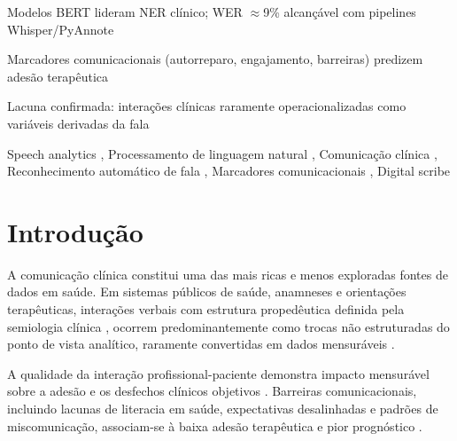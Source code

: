 \documentclass[a4paper,fleqn]{cas-sc}
\begin{document}
\begin{highlights}
\item Modelos BERT lideram NER clínico; WER $\approx$9\% alcançável com
      pipelines Whisper/PyAnnote
\item Marcadores comunicacionais (autorreparo, engajamento, barreiras)
      predizem adesão terapêutica
\item Lacuna confirmada: interações clínicas raramente operacionalizadas
      como variáveis derivadas da fala
\end{highlights}

\begin{keywords}
Speech analytics \sep
Processamento de linguagem natural \sep
Comunicação clínica \sep
Reconhecimento automático de fala \sep
Marcadores comunicacionais \sep
Digital scribe
\end{keywords}

\maketitle

\section{Introdução}
\label{sec:intro}

A comunicação clínica constitui uma das mais ricas e menos exploradas fontes
de dados em saúde. Em sistemas públicos de saúde, anamneses e orientações
terapêuticas, interações verbais com estrutura propedêutica definida
pela semiologia clínica \citep{Porto2019}, ocorrem predominantemente
como trocas não estruturadas do ponto de vista analítico, raramente
convertidas em dados mensuráveis \citep{Wang2018,Koleck2019}.

A qualidade da interação profissional-paciente demonstra impacto mensurável
sobre a adesão e os desfechos clínicos objetivos \citep{Kelley2014}. Barreiras
comunicacionais, incluindo lacunas de literacia em saúde, expectativas
desalinhadas e padrões de miscomunicação, associam-se à baixa adesão
terapêutica e pior prognóstico \citep{McCabe2018,Alkhamees2023}.
\end{document}
